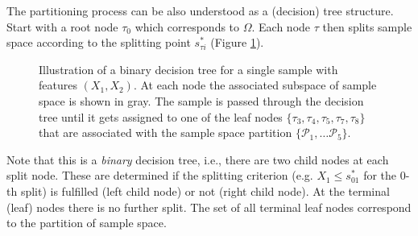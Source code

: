 \documentclass[12pt,a4paper]{article}
\begin{document}
The partitioning process can be also understood as a (decision) tree structure. Start with a root node $\tau_0$ which corresponds to $\Omega$. Each node $\tau$ then splits sample space according to the splitting point $s^*_{\tau i}$  (Figure \ref{fig:decision_tree}). 
\begin{figure}
\centering
{}

\caption{Illustration of a binary decision tree for a single sample with features $(X_1, X_2)$. At each node the associated subspace of sample space is shown in gray. The sample is passed through the decision tree until it gets assigned to one of the leaf nodes $\{\tau_3, \tau_4, \tau_5, \tau_7, \tau_8\}$ that are associated with the sample space partition $\{\mathcal P_1, \dots \mathcal P_5\}$.}

\label{fig:decision_tree}
\end{figure}
 Note that this is a \textit{binary} decision tree, i.e., there are two child nodes at each split node. These are determined if the splitting criterion (e.g. $X_1 \leq s_{01}^*$ for the 0-th split) is fulfilled (left child node) or not (right child node). At the terminal (leaf) nodes there is no further split. The set of all terminal leaf nodes correspond to the partition of sample space. 
 
\end{document}
